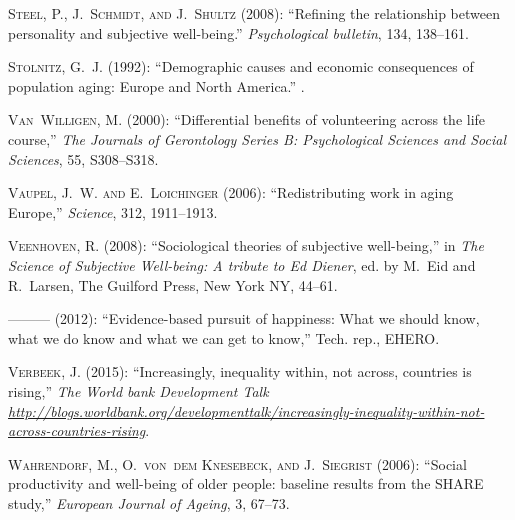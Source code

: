 \documentclass[10pt, letterpaper]{article}
\begin{document}
\begin{spacing}{1.4}
\begin{thebibliography}{71}
\textsc{Steel, P., J.~Schmidt, and J.~Shultz} (2008): \enquote{Refining the
  relationship between personality and subjective well-being.}
  \emph{Psychological bulletin}, 134, 138--161.

\textsc{Stolnitz, G.~J.} (1992): \enquote{Demographic causes and economic
  consequences of population aging: Europe and North America.} .

\textsc{Van~Willigen, M.} (2000): \enquote{Differential benefits of
  volunteering across the life course,} \emph{The Journals of Gerontology
  Series B: Psychological Sciences and Social Sciences}, 55, S308--S318.

\textsc{Vaupel, J.~W. and E.~Loichinger} (2006): \enquote{Redistributing work
  in aging Europe,} \emph{Science}, 312, 1911--1913.

\textsc{Veenhoven, R.} (2008): \enquote{Sociological theories of subjective
  well-being,} in \emph{The Science of Subjective Well-being: A tribute to Ed
  Diener}, ed. by M.~Eid and R.~Larsen, The Guilford Press, New York NY,
  44--61.

---\hspace{-.1pt}---\hspace{-.1pt}--- (2012): \enquote{Evidence-based pursuit
  of happiness: What we should know, what we do know and what we can get to
  know,} Tech. rep., EHERO.

\textsc{Verbeek, J.} (2015): \enquote{Increasingly, inequality within, not
  across, countries is rising,} \emph{The World bank Development Talk
  \url{http://blogs.worldbank.org/developmenttalk/increasingly-inequality-within-not-across-countries-rising}}.

\textsc{Wahrendorf, M., O.~von~dem Knesebeck, and J.~Siegrist} (2006):
  \enquote{Social productivity and well-being of older people: baseline results
  from the SHARE study,} \emph{European Journal of Ageing}, 3, 67--73.


\end{thebibliography}
\end{spacing}
\end{document}
